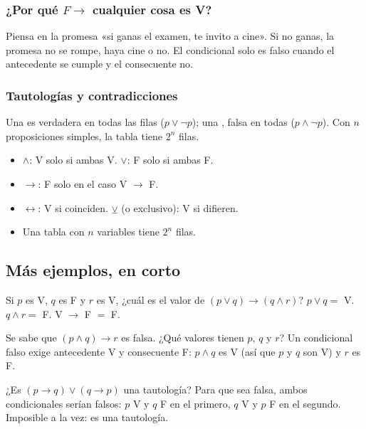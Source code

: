 \subsubsection{¿Por qué $F \to$ cualquier cosa es V?}
Piensa en la promesa «si ganas el examen, te invito a cine». Si no ganas, la promesa no se rompe, haya cine o no. El
condicional solo es falso cuando el antecedente se cumple y el consecuente no.

\subsubsection{Tautologías y contradicciones}
Una  es verdadera en todas las filas ($p \vee \neg p$); una , falsa en todas
($p \wedge \neg p$). Con $n$ proposiciones simples, la tabla tiene $2^n$ filas.


\begin{regla}
\begin{itemize}
  \item $\wedge$: V solo si ambas V. $\vee$: F solo si ambas F.
  \item $\to$: F solo en el caso V $\to$ F.
  \item $\leftrightarrow$: V si coinciden. $\veebar$ (o exclusivo): V si difieren.
  \item Una tabla con $n$ variables tiene $2^n$ filas.
\end{itemize}
\end{regla}

\subsection{Más ejemplos, en corto}
\begin{ejemplo}
Si $p$ es V, $q$ es F y $r$ es V, ¿cuál es el valor de $(p \vee q) \to (q \wedge r)$?
\solucion $p \vee q = $ V. $q \wedge r = $ F. V $\to$ F $=$ F.
\end{ejemplo}

\begin{ejemplo}
Se sabe que $(p \wedge q) \to r$ es falsa. ¿Qué valores tienen $p$, $q$ y $r$?
\solucion Un condicional falso exige antecedente V y consecuente F: $p \wedge q$ es V (así que $p$ y $q$ son V) y $r$
es F.
\end{ejemplo}

\begin{ejemplo}[¿Tautología?]
¿Es $(p \to q) \vee (q \to p)$ una tautología?
\solucion Para que sea falsa, ambos condicionales serían falsos: $p$ V y $q$ F en el primero, $q$ V y $p$ F en el
segundo. Imposible a la vez: es una tautología.
\end{ejemplo}

